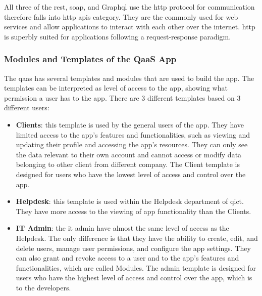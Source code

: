 \begin{multicols}{2}
      All three of the \acrshort{rest}, \acrshort{soap}, and Graph\acrshort{ql} use the \acrshort{http} protocol for
      communication therefore falls into \acrshort{http} \acrshort{api}s category. They are the commonly used for web
      services  and allow applications to interact with each other over the internet. \acrshort{http} is superbly
      suited for applications following a request-response paradigm.

      \subsubsection{Modules and Templates of the QaaS App}

      The \acrshort{qaas} has several templates and modules that are used to build the app. The templates can be
      interpreted as level of access to the app, showing what permission a user has to the app. There are 3 different
      templates based on 3 different users:

      \begin{itemize}
            \item \textbf{Clients}: this template is used by the general users of the app. They have limited access to
                  the app's features and functionalities, such as viewing and updating their profile and accessing the app's
                  resources. They can only see the data relevant to their own account and cannot access or modify data
                  belonging to other client from different company.  The Client template is designed for users who have the
                  lowest level of access and control over the app.
            \item \textbf{Helpdesk}: this template is used within the Helpdesk department of \acrshort{qict}. They have more
                  access to the viewing of app functionality than the Clients.
            \item \textbf{IT Admin}: the \acrshort{it} admin have almost the same level of access as the Helpdesk. The only
                  difference is that they have the ability to create, edit, and delete users, manage user permissions, and
                  configure the app settings. They can also grant and revoke access to a user and to the app's features and
                  functionalities, which are called Modules. The admin template is designed for users who have the highest level
                  of access and control over the app, which is to the developers.
      \end{itemize}


\end{multicols}
